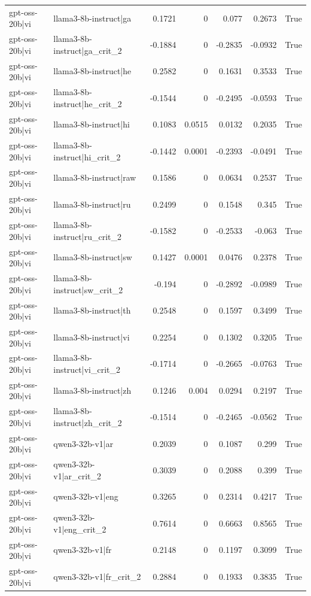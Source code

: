 \begin{table}
\begin{tabular}{l l r r r r l}
gpt-oss-20b|vi & llama3-8b-instruct|ga & 0.1721 & 0 & 0.077 & 0.2673 & True \\
gpt-oss-20b|vi & llama3-8b-instruct|ga_crit_2 & -0.1884 & 0 & -0.2835 & -0.0932 & True \\
gpt-oss-20b|vi & llama3-8b-instruct|he & 0.2582 & 0 & 0.1631 & 0.3533 & True \\
gpt-oss-20b|vi & llama3-8b-instruct|he_crit_2 & -0.1544 & 0 & -0.2495 & -0.0593 & True \\
gpt-oss-20b|vi & llama3-8b-instruct|hi & 0.1083 & 0.0515 & 0.0132 & 0.2035 & True \\
gpt-oss-20b|vi & llama3-8b-instruct|hi_crit_2 & -0.1442 & 0.0001 & -0.2393 & -0.0491 & True \\
gpt-oss-20b|vi & llama3-8b-instruct|raw & 0.1586 & 0 & 0.0634 & 0.2537 & True \\
gpt-oss-20b|vi & llama3-8b-instruct|ru & 0.2499 & 0 & 0.1548 & 0.345 & True \\
gpt-oss-20b|vi & llama3-8b-instruct|ru_crit_2 & -0.1582 & 0 & -0.2533 & -0.063 & True \\
gpt-oss-20b|vi & llama3-8b-instruct|sw & 0.1427 & 0.0001 & 0.0476 & 0.2378 & True \\
gpt-oss-20b|vi & llama3-8b-instruct|sw_crit_2 & -0.194 & 0 & -0.2892 & -0.0989 & True \\
gpt-oss-20b|vi & llama3-8b-instruct|th & 0.2548 & 0 & 0.1597 & 0.3499 & True \\
gpt-oss-20b|vi & llama3-8b-instruct|vi & 0.2254 & 0 & 0.1302 & 0.3205 & True \\
gpt-oss-20b|vi & llama3-8b-instruct|vi_crit_2 & -0.1714 & 0 & -0.2665 & -0.0763 & True \\
gpt-oss-20b|vi & llama3-8b-instruct|zh & 0.1246 & 0.004 & 0.0294 & 0.2197 & True \\
gpt-oss-20b|vi & llama3-8b-instruct|zh_crit_2 & -0.1514 & 0 & -0.2465 & -0.0562 & True \\
gpt-oss-20b|vi & qwen3-32b-v1|ar & 0.2039 & 0 & 0.1087 & 0.299 & True \\
gpt-oss-20b|vi & qwen3-32b-v1|ar_crit_2 & 0.3039 & 0 & 0.2088 & 0.399 & True \\
gpt-oss-20b|vi & qwen3-32b-v1|eng & 0.3265 & 0 & 0.2314 & 0.4217 & True \\
gpt-oss-20b|vi & qwen3-32b-v1|eng_crit_2 & 0.7614 & 0 & 0.6663 & 0.8565 & True \\
gpt-oss-20b|vi & qwen3-32b-v1|fr & 0.2148 & 0 & 0.1197 & 0.3099 & True \\
gpt-oss-20b|vi & qwen3-32b-v1|fr_crit_2 & 0.2884 & 0 & 0.1933 & 0.3835 & True \\

\end{tabular}
\end{table}
